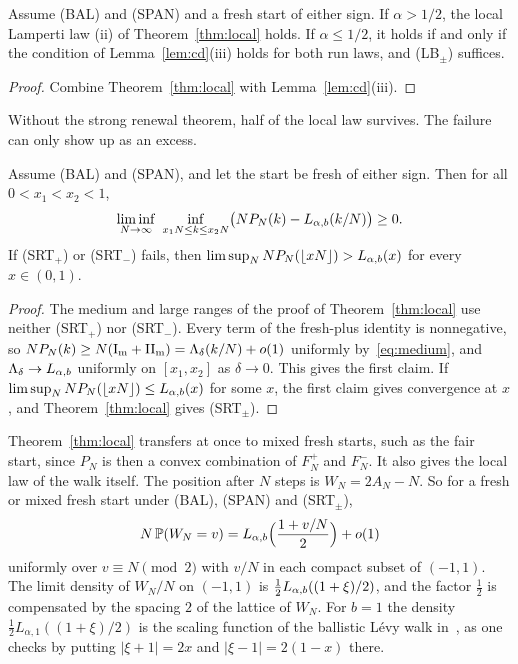 \begin{corollary}\label{cor:local-cases}
Assume (BAL) and (SPAN) and a fresh start of either sign. If $\alpha>1/2$, the
local Lamperti law (ii) of Theorem~\ref{thm:local} holds. If $\alpha\le1/2$, it holds if
and only if the condition of Lemma~\ref{lem:cd}(iii) holds for both run laws, and
(LB$_\pm$) suffices.
\end{corollary}

\begin{proof}
Combine Theorem~\ref{thm:local} with Lemma~\ref{lem:cd}(iii).
\end{proof}

Without the strong renewal theorem, half of the local law survives. The failure can only show
up as an excess.

\begin{corollary}\label{cor:lower}
Assume (BAL) and (SPAN), and let the start be fresh of either sign. Then for all
$0<x_1<x_2<1$,
\[
 \liminf_{N\to\infty}\ \inf_{x_1N\le k\le x_2N}\bigl(NP_N(k)-L_{\alpha,b}(k/N)\bigr)\ge0 .
\]
If (SRT$_\plus$) or (SRT$_\minus$) fails, then
$\limsup_NNP_N(\lfloor xN\rfloor)>L_{\alpha,b}(x)$ for every $x\in(0,1)$.
\end{corollary}

\begin{proof}
The medium and large ranges of the proof of Theorem~\ref{thm:local} use neither (SRT$_\plus$)
nor (SRT$_\minus$). Every term of the fresh-plus identity is nonnegative, so
$NP_N(k)\ge N(\mathrm I_{\rm m}+\mathrm{II}_{\rm m})=\Lambda_\delta(k/N)+o(1)$ uniformly
by~\eqref{eq:medium}, and $\Lambda_\delta\to L_{\alpha,b}$ uniformly on $[x_1,x_2]$ as $\delta\to0$. This
gives the first claim. If $\limsup_NNP_N(\lfloor xN\rfloor)\le L_{\alpha,b}(x)$ for some $x$, the first
claim gives convergence at $x$, and Theorem~\ref{thm:local} gives (SRT$_\pm$).
\end{proof}

Theorem~\ref{thm:local} transfers at once to mixed fresh starts, such as the fair start, since
$P_N$ is then a convex combination of $F^\plus_N$ and $F^\minus_N$. It also gives the local law
of the walk itself. The position after $N$ steps is $W_N=2A_N-N$. So for a fresh or mixed
fresh start under (BAL), (SPAN) and (SRT$_\pm$),
\[
 N\,\mathbb{P}(W_N=v)=L_{\alpha,b}\Bigl(\frac{1+v/N}2\Bigr)+o(1)
\]
uniformly over $v\equiv N\pmod 2$ with $v/N$ in each compact subset of $(-1,1)$. The limit
density of $W_N/N$ on $(-1,1)$ is $\frac12L_{\alpha,b}((1+\xi)/2)$, and the factor $\frac12$ is
compensated by the spacing $2$ of the lattice of $W_N$. For $b=1$ the density
$\frac12L_{\alpha,1}((1+\xi)/2)$ is the scaling function of the ballistic L\'evy walk
in~\cite[Eq.~(61)]{zdk2015}, as one checks by putting $|\xi+1|=2x$ and $|\xi-1|=2(1-x)$ there.

